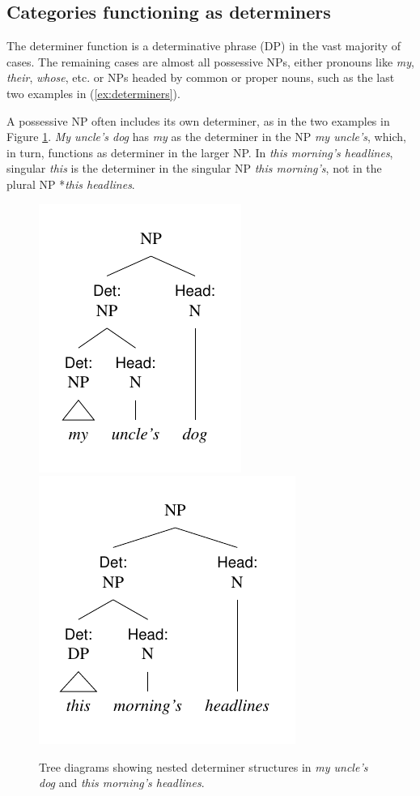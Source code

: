 \subsection{Categories functioning as determiners}

The determiner function is a determinative phrase (DP) in the vast majority of cases. The remaining cases are almost all possessive NPs, either pronouns like \textit{my}, \textit{their}, \textit{whose}, etc. or NPs headed by common or proper nouns, such as the last two examples in (\ref{ex:determiners}).

A possessive NP often includes its own determiner, as in the two examples in Figure \ref{fig:det-det}. \textit{My uncle's dog} has \textit{my} as the determiner in the NP \textit{my uncle's}, which, in turn, functions as determiner in the larger NP. In \textit{this morning's headlines}, singular \textit{this} is the determiner in the singular NP \textit{this morning's}, not in the plural NP *\textit{this headlines}.

\begin{figure}
    \centering
    \includegraphics[width=0.315\linewidth]{figures/my-uncles-dog.pdf}
    \includegraphics[width=0.4\linewidth]{figures/this-mornings-headlines.pdf}
    \caption{Tree diagrams showing nested determiner structures in \textit{my uncle's dog} and \textit{this morning's headlines}.}
    \label{fig:det-det}
\end{figure}

